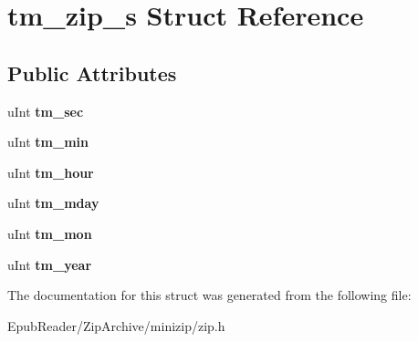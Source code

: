 \hypertarget{structtm__zip__s}{\section{tm\-\_\-zip\-\_\-s Struct Reference}
\label{structtm__zip__s}
}
\subsection*{Public Attributes}
\begin{DoxyCompactItemize}
\item 
\hypertarget{structtm__zip__s_adf073cb37484b209d7f7f0e23275a52d}{u\-Int {\bfseries tm\-\_\-sec}}\label{structtm__zip__s_adf073cb37484b209d7f7f0e23275a52d}

\item 
\hypertarget{structtm__zip__s_ad539676c1522e9f2cb77cb9e65795e2a}{u\-Int {\bfseries tm\-\_\-min}}\label{structtm__zip__s_ad539676c1522e9f2cb77cb9e65795e2a}

\item 
\hypertarget{structtm__zip__s_abfde1cc7378be65b4b23e1488e9bd279}{u\-Int {\bfseries tm\-\_\-hour}}\label{structtm__zip__s_abfde1cc7378be65b4b23e1488e9bd279}

\item 
\hypertarget{structtm__zip__s_aebc461dd0a4a7b7ebd4e00de5fbf594d}{u\-Int {\bfseries tm\-\_\-mday}}\label{structtm__zip__s_aebc461dd0a4a7b7ebd4e00de5fbf594d}

\item 
\hypertarget{structtm__zip__s_ae98d11f7e2b2330b3a83efe97ffef574}{u\-Int {\bfseries tm\-\_\-mon}}\label{structtm__zip__s_ae98d11f7e2b2330b3a83efe97ffef574}

\item 
\hypertarget{structtm__zip__s_ad58d60c6a536a0861dec11c6ef270753}{u\-Int {\bfseries tm\-\_\-year}}\label{structtm__zip__s_ad58d60c6a536a0861dec11c6ef270753}

\end{DoxyCompactItemize}


The documentation for this struct was generated from the following file\-:\begin{DoxyCompactItemize}
\item 
Epub\-Reader/\-Zip\-Archive/minizip/zip.\-h\end{DoxyCompactItemize}
